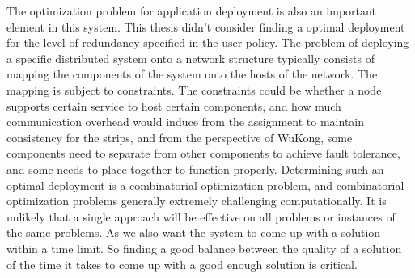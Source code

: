 The optimization problem for application deployment is also an important element
in this system. This thesis didn't consider finding a optimal deployment for the
level of redundancy specified in the user policy. The problem of deploying
a specific distributed system onto a network structure typically consists of
mapping the components of the system onto the hosts of the network. The mapping
is subject to constraints. The constraints could be whether a node supports
certain service to host certain components, and how much communication overhead
would induce from the assignment to maintain consistency for the strips, and
from the perspective of WuKong, some components need to separate from other
components to achieve fault tolerance, and some needs to place together to
function properly.  Determining such an optimal deployment is a combinatorial
optimization problem, and combinatorial optimization problems generally
extremely challenging computationally. It is unlikely that a single approach
will be effective on all problems or instances of the same problems. As we also
want the system to come up with a solution within a time limit. So finding
a good balance between the quality of a solution of the time it takes to come up
with a good enough solution is critical.

